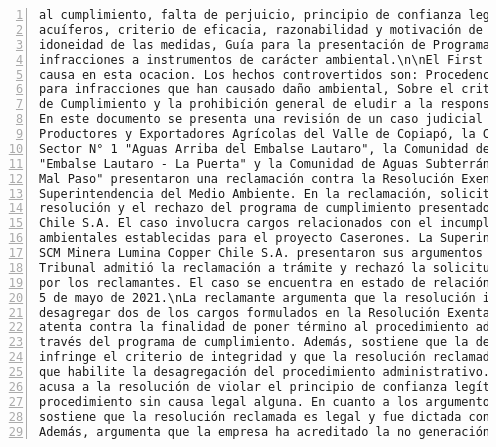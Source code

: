 \begin{Verbatim}[frame=lines, label=Elavoración propia -  Ejemplo de Contexto enviado por el Chatbot a OpenAI
				, fontsize=\scriptsize, numbers=left
				, baselinestretch=0.4
				, formatcom=\color{gray}]
al cumplimiento, falta de perjuicio, principio de confianza legitima, calidad de aguas,
acuíferos, criterio de eficacia, razonabilidad y motivación de la resolución de la SMA,
idoneidad de las medidas, Guía para la presentación de Programas de Cumplimiento por
infracciones a instrumentos de carácter ambiental.\n\nEl First Environmental Court Rechaza la
causa en esta ocacion. Los hechos controvertidos son: Procedencia del Programa de Cumplimiento
para infracciones que han causado daño ambiental, Sobre el criterio de eficacia del Programa
de Cumplimiento y la prohibición general de eludir a la responsabilidad.\n\nY el resumen es:
En este documento se presenta una revisión de un caso judicial en el que la Asociación de
Productores y Exportadores Agrícolas del Valle de Copiapó, la Comunidad de Aguas Subterráneas
Sector N° 1 "Aguas Arriba del Embalse Lautaro", la Comunidad de Aguas Subterráneas Sector N°2
"Embalse Lautaro - La Puerta" y la Comunidad de Aguas Subterráneas Sector N° 3 "La Puerta -
Mal Paso" presentaron una reclamación contra la Resolución Exenta Nº 15/Rol D-018-2019 de la
Superintendencia del Medio Ambiente. En la reclamación, solicitan la invalidación de la
resolución y el rechazo del programa de cumplimiento presentado por SCM Minera Lumina Copper
Chile S.A. El caso involucra cargos relacionados con el incumplimiento de condiciones
ambientales establecidas para el proyecto Caserones. La Superintendencia del Medio Ambiente y
SCM Minera Lumina Copper Chile S.A. presentaron sus argumentos en contra de la reclamación. El
Tribunal admitió la reclamación a trámite y rechazó la solicitud de medida cautelar presentada
por los reclamantes. El caso se encuentra en estado de relación y se llevó a cabo una vista el
5 de mayo de 2021.\nLa reclamante argumenta que la resolución impugnada infringe la ley al
desagregar dos de los cargos formulados en la Resolución Exenta N° 1/D-018-2019, lo cual
atenta contra la finalidad de poner término al procedimiento administrativo sancionador a
través del programa de cumplimiento. Además, sostiene que la desagregación de los cargos
infringe el criterio de integridad y que la resolución reclamada carece de una causal legal
que habilite la desagregación del procedimiento administrativo. Por otro lado, la reclamante
acusa a la resolución de violar el principio de confianza legítima al desagregar el
procedimiento sin causa legal alguna. En cuanto a los argumentos de la reclamada, esta
sostiene que la resolución reclamada es legal y fue dictada conforme a la normativa vigente.
Además, argumenta que la empresa ha acreditado la no generación de efectos negativos en

\end{Verbatim}
